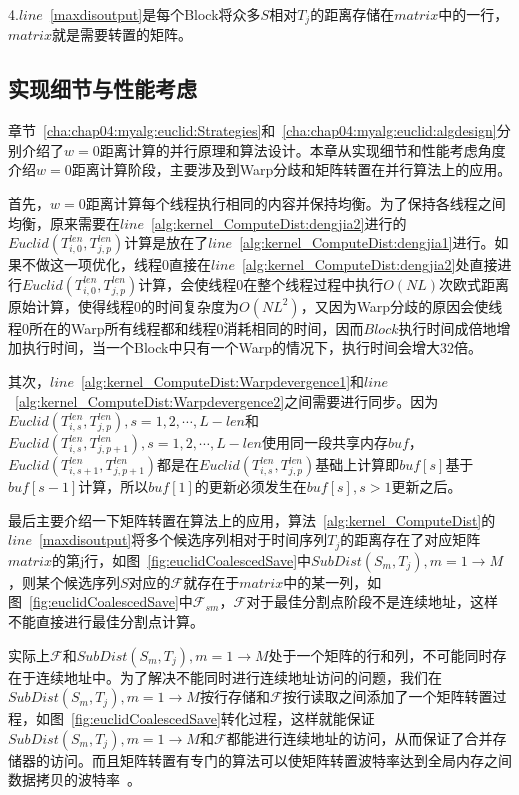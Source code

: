 4.$line$~\ref{maxdisoutput}是每个Block将众多$S$相对$T_j$的距离存储在$matrix$中的一行，$matrix$就是需要转置的矩阵。

\subsection{实现细节与性能考虑}
\label{cha:chap04:myalg:euclid:trick}

章节~\ref{cha:chap04:myalg:euclid:Strategies}和~\ref{cha:chap04:myalg:euclid:algdesign}分别介绍了$w=0$距离计算的并行原理和算法设计。本章从实现细节和性能考虑角度介绍$w=0$距离计算阶段，主要涉及到Warp分歧和矩阵转置在并行算法上的应用。

首先，$w=0$距离计算每个线程执行相同的内容并保持均衡。为了保持各线程之间均衡，原来需要在$line$~\ref{alg:kernel_ComputeDist:dengjia2}进行的$Euclid(T_{i,0}^{len},T_{j,p}^{len})$计算是放在了$line$~\ref{alg:kernel_ComputeDist:dengjia1}进行。如果不做这一项优化，线程0直接在$line$~\ref{alg:kernel_ComputeDist:dengjia2}处直接进行$Euclid(T_{i,0}^{len},T_{j,p}^{len})$计算，会使线程0在整个线程过程中执行$O(NL)$次欧式距离原始计算，使得线程0的时间复杂度为$O(NL^2)$，又因为Warp分歧的原因会使线程0所在的Warp所有线程都和线程0消耗相同的时间，因而$Block$执行时间成倍地增加执行时间，当一个Block中只有一个Warp的情况下，执行时间会增大32倍。

其次，$line$~\ref{alg:kernel_ComputeDist:Warpdevergence1}和$line$~\ref{alg:kernel_ComputeDist:Warpdevergence2}之间需要进行同步。因为$Euclid(T_{i,s}^{len},T_{j,p}^{len}),s=1,2,\cdots,L-len$和$Euclid(T_{i,s}^{len},T_{j,p+1}^{len}),s=1,2,\cdots,L-len$使用同一段共享内存$buf$，$Euclid(T_{i,s+1}^{len},T_{j,p+1}^{len})$都是在$Euclid(T_{i,s}^{len},T_{j,p}^{len})$基础上计算即$buf[s]$基于$buf[s-1]$计算，所以$buf[1]$的更新必须发生在$buf[s],s>1$更新之后。

最后主要介绍一下矩阵转置在算法上的应用，算法~\ref{alg:kernel_ComputeDist}的$line$~\ref{maxdisoutput}将多个候选序列相对于时间序列$T_j$的距离存在了对应矩阵$matrix$的第j行，如图~\ref{fig:euclidCoalescedSave}中$SubDist(S_m,T_j),m=1\to M$，则某个候选序列$S$对应的$\mathcal{F}$就存在于$matrix$中的某一列，如图~\ref{fig:euclidCoalescedSave}中$\mathcal{F}_{sm}$，$\mathcal{F}$对于最佳分割点阶段不是连续地址，这样不能直接进行最佳分割点计算。

实际上$\mathcal{F}$和$SubDist(S_m,T_j),m=1\to M$处于一个矩阵的行和列，不可能同时存在于连续地址中。为了解决不能同时进行连续地址访问的问题，我们在
$SubDist(S_m,T_j),m=1\to M$按行存储和$\mathcal{F}$按行读取之间添加了一个矩阵转置过程，如图~\ref{fig:euclidCoalescedSave}转化过程，这样就能保证$SubDist(S_m,T_j),m=1\to M$和$\mathcal{F}$都能进行连续地址的访问，从而保证了合并存储器的访问。而且矩阵转置有专门的算法可以使矩阵转置波特率达到全局内存之间数据拷贝的波特率~\cite{ruetsch2009optimizing}。


